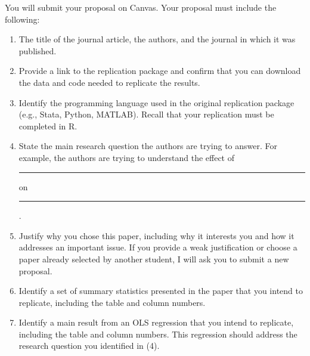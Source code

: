 \documentclass[11pt]{article}
\newcommand{\blank}{\rule[-0.2ex]{2.5em}{0.4pt}}
\begin{document}
You will submit your proposal on Canvas. Your proposal must include the following:
\begin{enumerate}
\item The title of the journal article, the authors, and the journal in which it was published.
\item Provide a link to the replication package and confirm that you can download the data and code needed to replicate the results.
\item Identify the programming language used in the original replication package (e.g., Stata, Python, MATLAB). Recall that your replication must be completed in R.
\item State the main research question the authors are trying to answer. For example, the authors are trying to understand the effect of \blank{} on \blank.
\item Justify why you chose this paper, including why it interests you and how it addresses an important issue. If you provide a weak justification or choose a paper already selected by another student, I will ask you to submit a new proposal.
\item Identify a set of summary statistics presented in the paper that you intend to replicate, including the table and column numbers.
\item Identify a main result from an OLS regression that you intend to replicate, including the table and column numbers. This regression should address the research question you identified in (4).
\end{enumerate}
\end{document}
